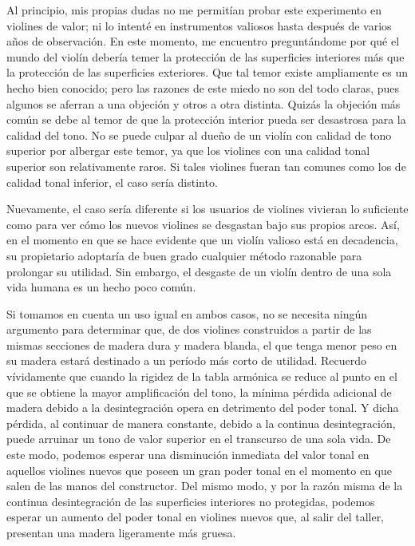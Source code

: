 \documentclass[12pt]{book}
\begin{document}
Al principio, mis propias dudas no me permitían probar este experimento en violines de valor; ni lo intenté en instrumentos valiosos hasta después de varios años de observación. En este momento, me encuentro preguntándome por qué el mundo del violín debería temer la protección de las superficies interiores más que la protección de las superficies exteriores. Que tal temor existe ampliamente es un hecho bien conocido; pero las razones de este miedo no son del todo claras, pues algunos se aferran a una objeción y otros a otra distinta. Quizás la objeción más común se debe al temor de que la protección interior pueda ser desastrosa para la calidad del tono. No se puede culpar al dueño de un violín con calidad de tono superior por albergar este temor, ya que los violines con una calidad tonal superior son relativamente raros. Si tales violines fueran tan comunes como los de calidad tonal inferior, el caso sería distinto.

Nuevamente, el caso sería diferente si los usuarios de violines vivieran lo suficiente como para ver cómo los nuevos violines se desgastan bajo sus propios arcos. Así, en el momento en que se hace evidente que un violín valioso está en decadencia, su propietario adoptaría de buen grado cualquier método razonable para prolongar su utilidad. Sin embargo, el desgaste de un violín dentro de una sola vida humana es un hecho poco común.

Si tomamos en cuenta un uso igual en ambos casos, no se necesita ningún argumento para determinar que, de dos violines construidos a partir de las mismas secciones de madera dura y madera blanda, el que tenga menor peso en su madera estará destinado a un período más corto de utilidad. Recuerdo vívidamente que cuando la rigidez de la tabla armónica se reduce al punto en el que se obtiene la mayor amplificación del tono, la mínima pérdida adicional de madera debido a la desintegración opera en detrimento del poder tonal. Y dicha pérdida, al continuar de manera constante, debido a la continua desintegración, puede arruinar un tono de valor superior en el transcurso de una sola vida. De este modo, podemos esperar una disminución inmediata del valor tonal en aquellos violines nuevos que poseen un gran poder tonal en el momento en que salen de las manos del constructor. Del mismo modo, y por la razón misma de la continua desintegración de las superficies interiores no protegidas, podemos esperar un aumento del poder tonal en violines nuevos que, al salir del taller, presentan una madera ligeramente más gruesa.
\end{document}
